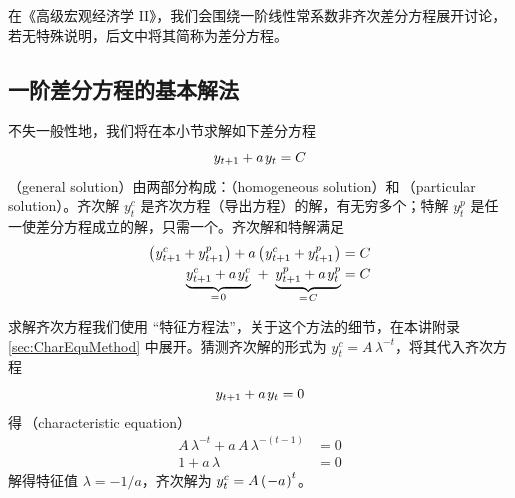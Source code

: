 在《高级宏观经济学 II》，我们会围绕一阶线性常系数非齐次差分方程展开讨论，若无特殊说明，后文中将其简称为差分方程。

\subsection{一阶差分方程的基本解法}\label{sec:DiffEquBasicSoln}

不失一般性地，我们将在本小节求解如下差分方程
\begin{equation}\label{eq:DiffEqu}
    y\nt+a\,y_t=C
\end{equation}
（general solution）由两部分构成：（homogeneous solution）和\,（particular solution）。齐次解 \(y_t^c\) 是齐次方程（导出方程）的解，有无穷多个；特解 \(y_t^p\) 是任一使差分方程成立的解，只需一个。齐次解和特解满足
\begin{align}
    \bka{y^c\nt+y^p\nt}+a\bka{y^c\nt+y^p\nt}&=C\\
    \underbrace{y^c\nt+a\,y^c_t}_{=\,0} \ + \ \underbrace{y^p\nt+a\,y^p_t}_{=\,C}&=C
\end{align}

求解齐次方程我们使用 “特征方程法”，关于这个方法的细节，在本讲附录\ref{sec:CharEquMethod} 中展开。猜测齐次解的形式为 \(y_t^c=A\,\lambda^{-t}\)，将其代入齐次方程
\begin{equation}
    y\nt+a\,y_t=0
\end{equation}
得\,（characteristic equation）
\begin{align}
    A\,\lambda^{-t} + a\,A\,\lambda^{-(t-1)}&=0\\
    1 + a\,\lambda&=0
\end{align}
解得特征值 \(\lambda=-1/a\)，齐次解为 \(y_t^c=A\left(\mspace{1mu}-a\mspace{1mu}\right)^{t}\)。

